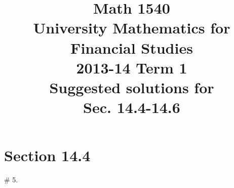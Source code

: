 \documentclass[8pt]{article} %
\title{Math 1540\\University Mathematics for Financial Studies\\2013-14 Term 1\\Suggested solutions for\\
Sec. 14.4-14.6}
\begin{document}
\maketitle
\section{Section 14.4}
\begin{description}
	\item[\# 5.]{{\it }
		}
\end{description}
\end{document}
